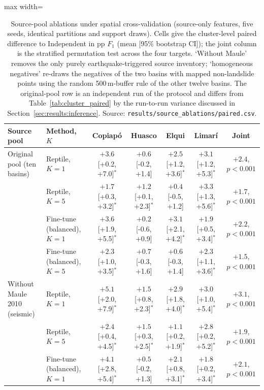 \begin{table}[ht]
    \centering
    \caption{Source-pool ablations under spatial cross-validation (source-only features, five seeds, identical partitions and support draws). Cells give the cluster-level paired difference to Independent in pp $F_1$ (mean [95\% bootstrap CI]); the joint column is the stratified permutation test across the four targets. `Without Maule' removes the only purely earthquake-triggered source inventory; `homogeneous negatives' re-draws the negatives of the two basins with mapped non-landslide points using the random 500\,m-buffer rule of the other twelve basins. The original-pool row is an independent run of the protocol and differs from Table~\ref{tab:cluster_paired} by the run-to-run variance discussed in Section~\ref{sec:results:inference}. Source: \texttt{results/source\_ablations/paired.csv}.}
    \label{tab:source_ablations}
    \footnotesize
    \begin{adjustbox}{max width=\textwidth}
    \begin{tabular}{llccccc}
        \toprule
        \textbf{Source pool} & \textbf{Method, $K$} & \textbf{Copiap\'o} & \textbf{Huasco} & \textbf{Elqui} & \textbf{Limar\'i} & \textbf{Joint} \\
        \midrule
        Original pool (ten basins) & Reptile, $K=1$ & $+3.6$ [+0.2, +7.0]$^{*}$ & $+0.6$ [-0.2, +1.4] & $+2.5$ [+1.2, +3.6]$^{*}$ & $+3.1$ [+1.2, +5.3]$^{*}$ & $+2.4$, $p<0.001$ \\
         & Reptile, $K=5$ & $+1.7$ [+0.3, +3.2]$^{*}$ & $+1.2$ [+0.1, +2.3]$^{*}$ & $+0.4$ [-0.5, +1.2] & $+3.3$ [+1.3, +5.6]$^{*}$ & $+1.7$, $p<0.001$ \\
         & Fine-tune (balanced), $K=1$ & $+3.6$ [+1.9, +5.5]$^{*}$ & $+0.2$ [-0.6, +0.9] & $+3.1$ [+2.1, +4.2]$^{*}$ & $+1.9$ [+0.5, +3.4]$^{*}$ & $+2.2$, $p<0.001$ \\
         & Fine-tune (balanced), $K=5$ & $+2.3$ [+1.0, +3.5]$^{*}$ & $+0.7$ [-0.3, +1.6] & $+0.6$ [-0.3, +1.4] & $+2.3$ [+1.1, +3.6]$^{*}$ & $+1.5$, $p<0.001$ \\
        \midrule
        Without Maule 2010 (seismic) & Reptile, $K=1$ & $+5.1$ [+2.0, +7.9]$^{*}$ & $+1.5$ [+0.8, +2.3]$^{*}$ & $+2.9$ [+1.8, +4.0]$^{*}$ & $+3.0$ [+1.0, +5.4]$^{*}$ & $+3.1$, $p<0.001$ \\
         & Reptile, $K=5$ & $+2.4$ [+0.4, +4.5]$^{*}$ & $+1.5$ [+0.3, +2.5]$^{*}$ & $+1.1$ [+0.2, +1.9]$^{*}$ & $+2.8$ [+0.2, +5.2]$^{*}$ & $+1.9$, $p<0.001$ \\
         & Fine-tune (balanced), $K=1$ & $+4.1$ [+2.8, +5.4]$^{*}$ & $+0.5$ [-0.2, +1.3] & $+2.1$ [+0.8, +3.1]$^{*}$ & $+1.8$ [+0.2, +3.4]$^{*}$ & $+2.1$, $p<0.001$ \\

\end{tabular}
\end{adjustbox}
\end{table}
